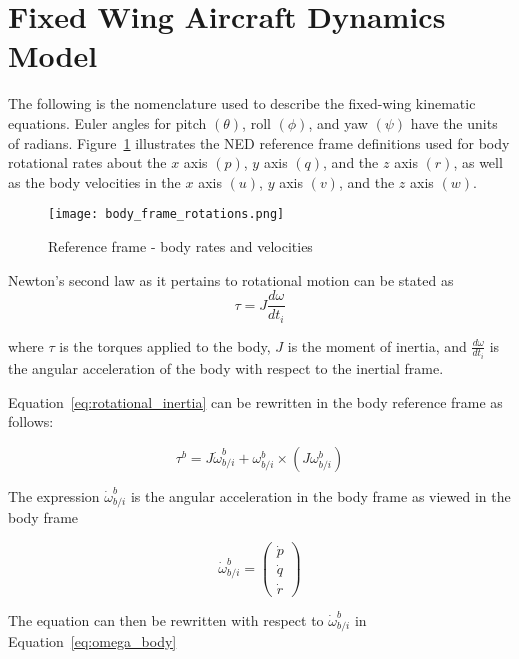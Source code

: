 \label{appendix:dynamics_model}
\section{Fixed Wing Aircraft Dynamics Model}

The following is the nomenclature used to describe the fixed-wing kinematic equations.  Euler angles for pitch $(\theta)$, roll $(\phi)$, and yaw $(\psi)$ have the units of radians.  Figure~\ref{fig:reference_frame} illustrates the \ac{NED} reference frame definitions used for body rotational rates about the $x$ axis $(p)$, $y$ axis $(q)$, and the $z$ axis $(r)$, as well as the body velocities in the $x$ axis $(u)$, $y$ axis $(v)$, and the $z$ axis $(w)$.

\begin{figure}[h!]
 \centering
  \texttt{[image: body\_frame\_rotations.png]}
  \caption{Reference frame - body rates and velocities}
  \label{fig:reference_frame}
\end{figure} 

Newton's second law as it pertains to rotational motion can be stated as
\begin{equation}\label{eq:rotational_inertia}
\tau=J\frac{d\omega}{dt_i}
\end{equation}

where $\tau$ is the torques applied to the body, $J$ is the moment of inertia, and $ \frac{d\omega}{dt_i}$ is the angular acceleration of the body with respect to the inertial frame.

Equation~\ref{eq:rotational_inertia} can be rewritten in the body reference frame as follows:

\begin{equation}
\tau^b=J\dot{\omega}_{b/i}^b+\omega_{b/i}^b\times\left(J\omega_{b/i}^b\right)
\end{equation}

The expression $\dot{\omega}_{b/i}^b$ is the angular acceleration in the body frame as viewed in the body frame

\begin{equation}\label{eq:omega_body}
\dot{\omega}_{b/i}^b=
\begin{pmatrix}
\dot{p}\\
\dot{q}\\
\dot{r}
\end{pmatrix}
\end{equation}

The equation can then be rewritten with respect to $\dot{\omega}_{b/i}^b$ in Equation~\ref{eq:omega_body}

